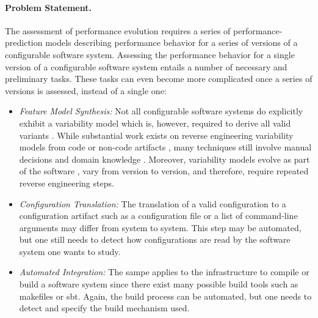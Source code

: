 \paragraph{Problem Statement.}
The assessment of performance evolution requires a series of
performance-prediction models describing performance behavior for a series of
versions of a configurable software system. Assessing the performance behavior
for a single version of a configurable software system entails a number of
necessary and preliminary tasks. These tasks can even become more complicated
once a series of versions is assessed, instead of a single one:
\begin{itemize}
  \item \emph{Feature Model Synthesis:} Not all configurable software systems do
  explicitly exhibit a variability model which is, however, required to derive
  all valid variants \citep{rabkin_static_2011,nadi_where_2015}.
	While substantial work exists on reverse engineering variability models from
	code
	\citep{rabkin_static_2011,she_reverse_2011,zhou_extracting_2015,nadi_where_2015}
	 or non-code artifacts
	\citep{alves_exploratory_2008,andersen_efficient_2012,bakar_feature_2015}, many
	techniques still involve manual decisions \citep{she_reverse_2011} and domain
	knowledge \citep{nadi_where_2015}.
	Moreover, variability models evolve as part of the software
	\citep{peng_analyzing_2011}, vary from version to version, and therefore,
	require repeated reverse engineering steps.
	
	\item \emph{Configuration Translation:} The translation of a valid
	configuration to a configuration artifact such as a configuration file or a list of command-line arguments may differ
from system to system. This step may be automated, but one still needs to
detect how configurations are read by the software system one wants to study.

\item \emph{Automated Integration:} The sampe applies to the
infrastructure to compile or build a software system since there exist many
possible build tools such as makefiles or sbt.
Again, the build process can be automated, but one needs to detect and
specify the build mechanism used.


\end{itemize}
